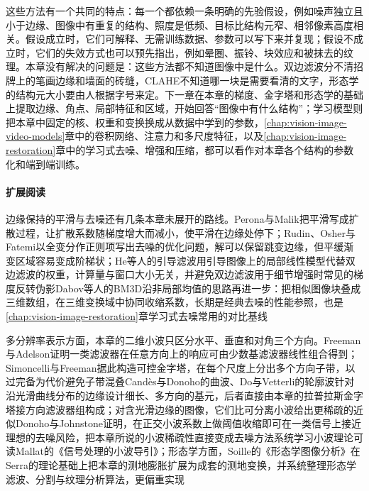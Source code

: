 这些方法有一个共同的特点：每一个都依赖一条明确的先验假设，例如噪声独立且小于边缘、图像中有重复的结构、照度是低频、目标比结构元窄、相邻像素高度相关。假设成立时，它们可解释、无需训练数据、参数可以写下来并复现；假设不成立时，它们的失效方式也可以预先指出，例如晕圈、振铃、块效应和被抹去的纹理。本章没有解决的问题是：这些方法都不知道图像中是什么。双边滤波分不清招牌上的笔画边缘和墙面的砖缝，CLAHE不知道哪一块是需要看清的文字，形态学的结构元大小要由人根据字号来定。下一章在本章的梯度、金字塔和形态学的基础上提取边缘、角点、局部特征和区域，开始回答“图像中有什么结构”；学习模型则把本章中固定的核、权重和变换换成从数据中学到的参数，\ref{chap:vision-image-video-models}章中的卷积网络、注意力和多尺度特征，以及\ref{chap:vision-image-restoration}章中的学习式去噪、增强和压缩，都可以看作对本章各个结构的参数化和端到端训练。

\paragraph{扩展阅读}
边缘保持的平滑与去噪还有几条本章未展开的路线。Perona与Malik把平滑写成扩散过程，让扩散系数随梯度增大而减小，使平滑在边缘处停下；Rudin、Osher与Fatemi以全变分作正则项写出去噪的优化问题，解可以保留跳变边缘，但平缓渐变区域容易变成阶梯状；He等人的引导滤波用引导图像上的局部线性模型代替双边滤波的权重，计算量与窗口大小无关，并避免双边滤波用于细节增强时常见的梯度反转伪影Dabov等人的BM3D沿非局部均值的思路再进一步：把相似图像块叠成三维数组，在三维变换域中协同收缩系数，长期是经典去噪的性能参照，也是\ref{chap:vision-image-restoration}章学习式去噪常用的对比基线

多分辨率表示方面，本章的二维小波只区分水平、垂直和对角三个方向。Freeman与Adelson证明一类滤波器在任意方向上的响应可由少数基滤波器线性组合得到；Simoncelli与Freeman据此构造可控金字塔，在每个尺度上分出多个方向子带，以过完备为代价避免子带混叠Candès与Donoho的曲波、Do与Vetterli的轮廓波针对沿光滑曲线分布的边缘设计细长、多方向的基元，后者直接由本章的拉普拉斯金字塔接方向滤波器组构成；对含光滑边缘的图像，它们比可分离小波给出更稀疏的近似Donoho与Johnstone证明，在正交小波系数上做阈值收缩即可在一类信号上接近理想的去噪风险，把本章所说的小波稀疏性直接变成去噪方法系统学习小波理论可读Mallat的《信号处理的小波导引》；形态学方面，Soille的《形态学图像分析》在Serra的理论基础上把本章的测地膨胀扩展为成套的测地变换，并系统整理形态学滤波、分割与纹理分析算法，更偏重实现
